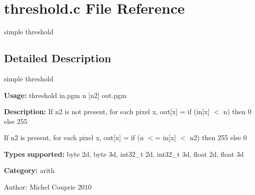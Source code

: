 \section{threshold.c File Reference}
\label{threshold_8c}
simple threshold 



\subsection{Detailed Description}
simple threshold 

{\bf Usage:} threshold in.pgm n [n2] out.pgm

{\bf Description:} If n2 is not present, for each pixel x, out[x] = if (in[x] $<$ n) then 0 else 255

If n2 is present, for each pixel x, out[x] = if (n $<$= in[x] $<$ n2) then 255 else 0

{\bf Types supported:} byte 2d, byte 3d, int32\_\-t 2d, int32\_\-t 3d, float 2d, float 3d

{\bf Category:} arith

\begin{Desc}
\item[Author:]Michel Couprie 2010 \end{Desc}
